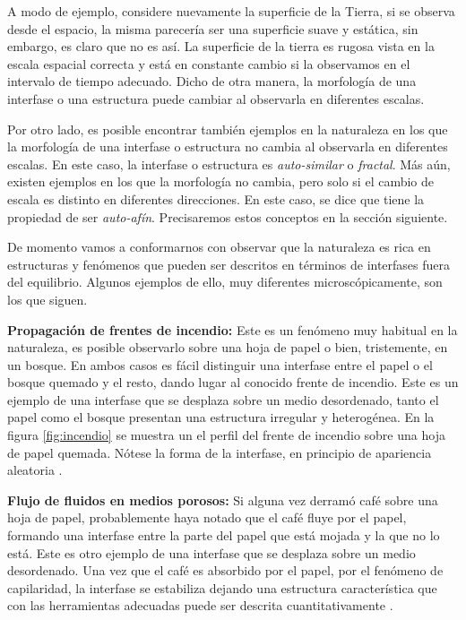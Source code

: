 A modo de ejemplo, considere nuevamente la superficie de la Tierra, si se observa desde el espacio, la misma parecería ser una superficie suave y estática,
sin embargo, es claro que no es así. La superficie de la tierra es rugosa vista en la escala espacial correcta y está en constante cambio si la observamos en el 
intervalo de tiempo adecuado.  Dicho de otra manera, la morfología de una interfase o una estructura puede cambiar al observarla en diferentes escalas. 

Por otro lado, es posible encontrar también ejemplos en la naturaleza en los que la morfología de una interfase o estructura no cambia al observarla en diferentes 
escalas. En este caso, la interfase o estructura es \textit{auto-similar} o \textit{fractal}. Más aún, existen ejemplos en los que la morfología no cambia, pero solo si 
el cambio de escala es distinto en diferentes direcciones. En este caso, se dice que tiene la propiedad de ser \textit{auto-afín}. Precisaremos estos conceptos en 
la sección siguiente. 

De momento vamos a conformarnos con observar que la naturaleza es rica en estructuras y fenómenos que pueden ser descritos en términos de interfases fuera del equilibrio. 
Algunos ejemplos de ello, muy diferentes microscópicamente, son los que siguen.

\textbf{Propagación de frentes de incendio:} Este es un fenómeno muy habitual en la naturaleza, es posible observarlo sobre una hoja de papel o bien, tristemente, 
    en un bosque. En ambos casos es fácil distinguir una interfase entre el papel o el bosque quemado y el resto, dando lugar al conocido frente de incendio. Este es un 
    ejemplo de una interfase que se desplaza sobre un medio desordenado, tanto el papel como el bosque presentan una estructura irregular y heterogénea. En la figura 
    \ref{fig:incendio} se muestra un el perfil del frente de incendio sobre una hoja de papel quemada. Nótese la forma de la interfase, en principio de apariencia 
    aleatoria \cite{zhang1992modeling,provatas1995scaling,PhysRevLett.79.1515}.

\textbf{Flujo de fluidos en medios porosos:} Si alguna vez derramó café sobre una hoja de papel, probablemente haya notado que el café fluye por el papel, 
    formando una interfase entre la parte del papel que está mojada y la que no lo está. Este es otro ejemplo de una interfase que se desplaza sobre un medio 
    desordenado. Una vez que el café es absorbido por el papel, por el fenómeno de capilaridad, la interfase se estabiliza dejando una estructura característica que con las herramientas 
    adecuadas puede ser descrita cuantitativamente \cite{Jullien1992SurfaceD,PhysRevLett.110.035501}.

